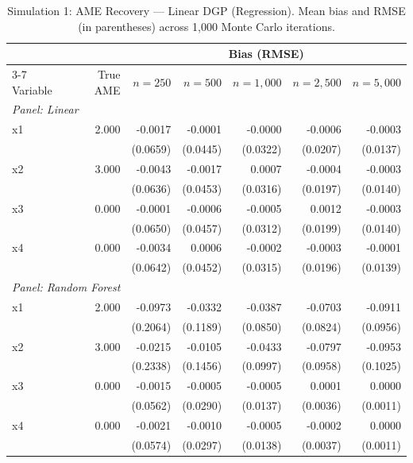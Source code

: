\documentclass[12pt]{article}
\begin{document}
	\begin{table}[htbp]
		\centering
		\small
		\begin{threeparttable}
			\caption{Simulation 1: AME Recovery --- Linear DGP (Regression). Mean bias and RMSE (in parentheses) across 1,000 Monte Carlo iterations.}
			\label{tab:sim1_regression_linear}
			\begin{tabular}{lrrrrrr}
				\toprule
				& & \multicolumn{5}{c}{Bias (RMSE)} \\
				\cmidrule(lr){3-7}
				Variable & True AME & $n=250$ & $n=500$ & $n=1,000$ & $n=2,500$ & $n=5,000$ \\
				\midrule
				\multicolumn{7}{l}{\textit{Panel: Linear}} \\
				\quad x1 & 2.000 & -0.0017 & -0.0001 & -0.0000 & -0.0006 & -0.0003 \\
				&  & (0.0659) & (0.0445) & (0.0322) & (0.0207) & (0.0137) \\
				\quad x2 & 3.000 & -0.0043 & -0.0017 & 0.0007 & -0.0004 & -0.0003 \\
				&  & (0.0636) & (0.0453) & (0.0316) & (0.0197) & (0.0140) \\
				\quad x3 & 0.000 & -0.0001 & -0.0006 & -0.0005 & 0.0012 & -0.0003 \\
				&  & (0.0650) & (0.0457) & (0.0312) & (0.0199) & (0.0140) \\
				\quad x4 & 0.000 & -0.0034 & 0.0006 & -0.0002 & -0.0003 & -0.0001 \\
				&  & (0.0642) & (0.0452) & (0.0315) & (0.0196) & (0.0139) \\
				\midrule
				\multicolumn{7}{l}{\textit{Panel: Random Forest}} \\
				\quad x1 & 2.000 & -0.0973 & -0.0332 & -0.0387 & -0.0703 & -0.0911 \\
				&  & (0.2064) & (0.1189) & (0.0850) & (0.0824) & (0.0956) \\
				\quad x2 & 3.000 & -0.0215 & -0.0105 & -0.0433 & -0.0797 & -0.0953 \\
				&  & (0.2338) & (0.1456) & (0.0997) & (0.0958) & (0.1025) \\
				\quad x3 & 0.000 & -0.0015 & -0.0005 & -0.0005 & 0.0001 & 0.0000 \\
				&  & (0.0562) & (0.0290) & (0.0137) & (0.0036) & (0.0011) \\
				\quad x4 & 0.000 & -0.0021 & -0.0010 & -0.0005 & -0.0002 & 0.0000 \\
				&  & (0.0574) & (0.0297) & (0.0138) & (0.0037) & (0.0011) \\
				\midrule

\end{tabular}
\end{threeparttable}
\end{table}
\end{document}

